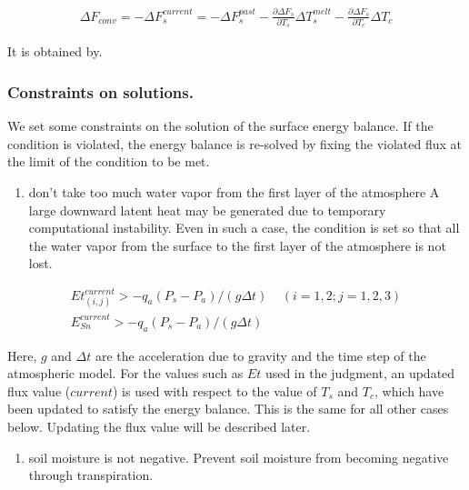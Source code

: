 \begin{eqnarray}
 \Delta F_{conv} =
 - \Delta F_s^{current} = - \Delta F_s^{past}
 - \frac{\partial \Delta F_s}{\partial T_s} \Delta T_s^{melt}
 - \frac{\partial \Delta F_s}{\partial T_c} \Delta T_c
\end{eqnarray}

It is obtained by.

\hypertarget{constraints-on-solutions.}{%
\subsubsection{Constraints on
solutions.}\label{constraints-on-solutions.}}

We set some constraints on the solution of the surface energy balance.
If the condition is violated, the energy balance is re-solved by fixing
the violated flux at the limit of the condition to be met.

\begin{enumerate}
\def\labelenumi{\arabic{enumi}.}
\tightlist
\item
  don't take too much water vapor from the first layer of the atmosphere
  A large downward latent heat may be generated due to temporary
  computational instability. Even in such a case, the condition is set
  so that all the water vapor from the surface to the first layer of the
  atmosphere is not lost.
\end{enumerate}

\begin{eqnarray}
  Et_{(i,j)}^{current} > - q_a ( P_s - P_a ) / (g \Delta t)
   \ \ \ \ \ (i=1,2 ; j=1,2,3) \\
  E_{Sn}^{current} > - q_a ( P_s - P_a ) / (g \Delta t)
\end{eqnarray}

Here, \(g\) and \(\Delta t\) are the acceleration due to gravity and the
time step of the atmospheric model. For the values such as \(Et\) used
in the judgment, an updated flux value (\(current\)) is used with
respect to the value of \(T_s\) and \(T_c\), which have been updated to
satisfy the energy balance. This is the same for all other cases below.
Updating the flux value will be described later.

\begin{enumerate}
\def\labelenumi{\arabic{enumi}.}
\setcounter{enumi}{1}
\tightlist
\item
  soil moisture is not negative. Prevent soil moisture from becoming
  negative through transpiration.
\end{enumerate}

